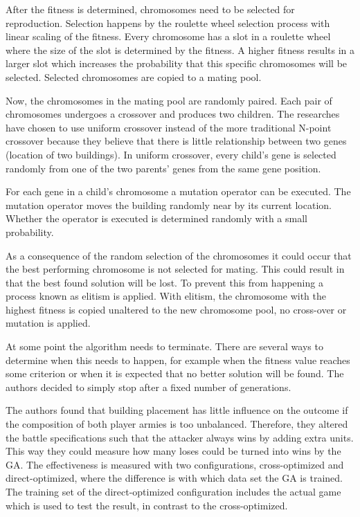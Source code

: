 After the fitness is determined, chromosomes need to be selected for reproduction. Selection happens by the roulette wheel selection process\citep{goldberg89} with linear scaling of the fitness. Every chromosome has a slot in a roulette wheel where the size of the slot is determined by the fitness. A higher fitness results in a larger slot which increases the probability that this specific chromosomes will be selected. Selected chromosomes are copied to a mating pool.

Now, the chromosomes in the mating pool are randomly paired. Each pair of chromosomes undergoes a crossover and produces two children. The researches have chosen to use uniform crossover instead of the more traditional N-point crossover because they believe that there is little relationship between two genes (location of two buildings). In uniform crossover, every child's gene is selected randomly from one of the two parents' genes from the same gene position.       

For each gene in a child's chromosome a mutation operator can be executed. The mutation operator moves the building randomly near by its current location. Whether the operator is executed is determined randomly with a small probability.

As a consequence of the random selection of the chromosomes it could occur that the best performing chromosome is not selected for mating. This could result in that the best found solution will be lost. To prevent this from happening a process known as elitism is applied. With elitism, the chromosome with the highest fitness is copied unaltered to the new chromosome pool, no cross-over or mutation is applied.

At some point the algorithm needs to terminate. There are several ways to determine when this needs to happen, for example when the fitness value reaches some criterion or when it is expected that no better solution will be found. The authors decided to simply stop after a fixed number of generations\citep{barriga2014building}.

The authors found that building placement has little influence on the outcome if the composition of both player armies is too unbalanced. Therefore, they altered the battle specifications such that the attacker always wins by adding extra units. This way they could measure how many loses could be turned into wins by the GA. The effectiveness is measured with two configurations, cross-optimized and direct-optimized, where the difference is with which data set the GA is trained. The training set of the direct-optimized configuration includes the actual game which is used to test the result, in contrast to the cross-optimized.

